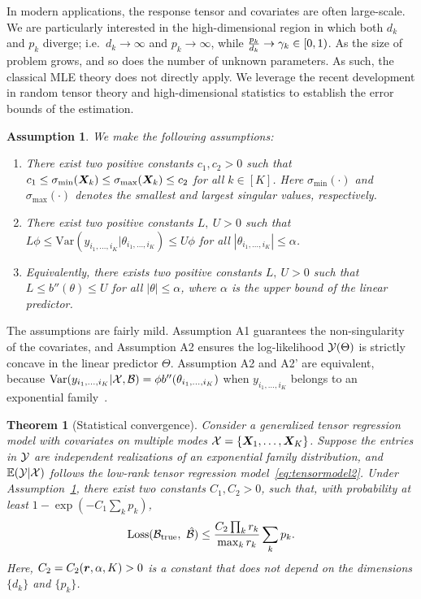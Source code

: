 \documentclass[12pt]{article}
\theoremstyle{plain}
\newtheorem{thm}{Theorem}[section]
\newtheorem{assumption}{Assumption}
\theoremstyle{definition}
\begin{document}
In modern applications, the response tensor and covariates are often large-scale. We are particularly interested in the high-dimensional region in which both $d_k$ and $p_k$ diverge; i.e.\ $d_k\to \infty$ and $p_k\to\infty$, while ${p_k\over d_k} \to \gamma_k \in[0,1)$. As the size of problem grows, and so does the number of unknown parameters. As such, the classical MLE theory does not directly apply. We leverage the recent development in random tensor theory and high-dimensional statistics to establish the error bounds of the estimation. 

  
  
\begin{assumption}\label{ass}We make the following assumptions:
\begin{enumerate}
\item [A1.] There exist two positive constants $c_1, c_2>0$ such that $c_1\leq \sigma_{\min}(\bm X_k)\leq  \sigma_{\max}(\bm X_k)\leq c_2$ for all $k\in[K]$. Here $\sigma_{\text{min}}(\cdot)$ and $\sigma_{\text{max}}(\cdot)$ denotes the smallest and largest singular values, respectively.
\item [A2.] There exist two positive constants $L,\ U>0$ such that $L\phi \leq \text{Var}(y_{i_1,\ldots,i_K}|\theta_{i_1,\ldots,i_K})\leq U\phi $ for all $|\theta_{i_1,\ldots,i_K}|\leq \alpha$.
\item[A2'.] Equivalently, there exists two positive constants $L,\ U>0$ such that $L\leq b''(\theta) \leq U$ for all $|\theta|\leq \alpha$, where $\alpha$ is the upper bound of the linear predictor. 

\end{enumerate}
\end{assumption}
The assumptions are fairly mild. Assumption A1 guarantees the non-singularity of the covariates, and Assumption A2 ensures the log-likelihood $\mathcal{Y}(\Theta)$ is strictly concave in the linear predictor $\Theta$. Assumption A2 and A2' are equivalent, because $\text{Var}(y_{i_1,\ldots,i_K}|\mathcal{X},\mathcal{B})=\phi b''(\theta_{i_1,\ldots,i_K})$ when $y_{i_1,\ldots,i_K}$ belongs to an exponential family~\citep{mccullagh1989generalized}. 

  
\begin{thm}[Statistical convergence]\label{thm:main}
Consider a generalized tensor regression model with covariates on multiple modes $\mathcal{X}=\{\bm X_1,\ldots,\bm X_K\}$. Suppose the entries in $\mathcal{Y}$ are independent realizations of an exponential family distribution, and $\mathbb{E}(\mathcal{Y}|\mathcal{X})$ follows the low-rank tensor regression model~\eqref{eq:tensormodel2}. Under Assumption~\ref{ass}, there exist two constants $C_1, C_2>0$, such that, with probability at least $1-\exp(-C_1\sum_k p_k)$, 
\begin{equation}\label{eq:bound}
\text{Loss}(\mathcal{B}_{\text{true}},\ \hat {\mathcal{B}}) \leq \frac{ C_{2}\prod_kr_k}{\max_k r_k}\sum_k p_k.
\end{equation}
Here, $C_2=C_2(\bm{r},\alpha, K)>0$ is a constant that does not depend on the dimensions $\{d_k\}$ and $\{p_k\}$. 
\end{thm}
\end{document}
